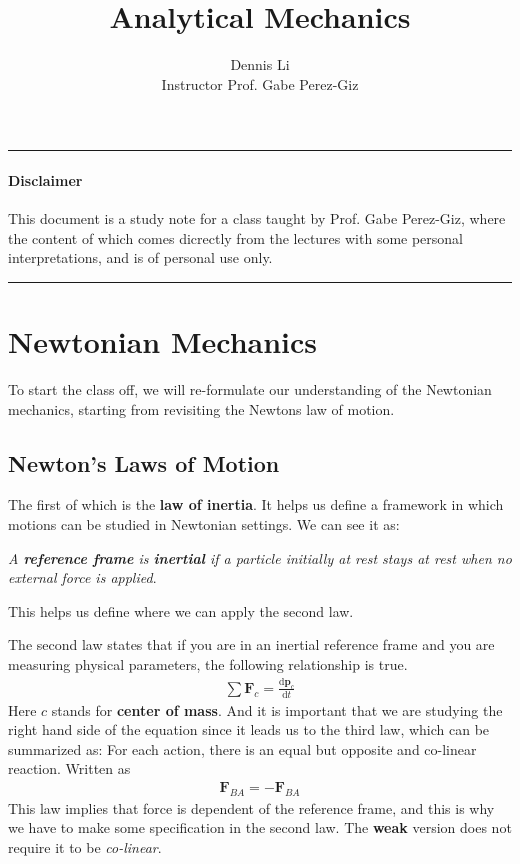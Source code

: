 \documentclass[12pt]{article}
\title{\textbf{Analytical Mechanics}}
\author{Dennis Li\\Instructor Prof. Gabe Perez-Giz}
\newcommand{\dydx}[2]{\frac{\text{d} #1}{\text{d} #2}}
\begin{document}
\maketitle
\hrule
\paragraph{Disclaimer} This document is a study note for a class taught by Prof. Gabe Perez-Giz, where the content of which comes dicrectly from the lectures with some personal interpretations, and is of personal use only.
\vspace{3ex}
\hrule

\section{Newtonian Mechanics}
To start the class off, we will re-formulate our understanding of the Newtonian mechanics, starting from revisiting the Newtons law of motion. 

\subsection{Newton's Laws of Motion}
The first of which is the \textbf{law of inertia}. It helps us define a framework in which motions can be studied in Newtonian settings. We can see it as: 

\textit{A \textbf{reference frame} is \textbf{inertial} if a particle initially at rest stays at rest when no external force is applied}. 


This helps us define where we can apply the second law.

The second law states that if you are in an inertial reference frame and you are measuring physical parameters, the following relationship is true.
\begin{align}
\sum \mathbf{F}_{c} = \dydx{\mathbf{p}_{c}}{t}
\end{align}
Here $c$ stands for \textbf{center of mass}. And it is important that we are studying the right hand side of the equation since it leads us to the third law, which can be summarized as: For each action, there is an equal but opposite and co-linear reaction. Written as
\begin{align}
\mathbf{F}_{BA} = - \mathbf{F}_{BA}
\end{align}
This law implies that force is dependent of the reference frame, and this is why we have to make some specification in the second law. The \textbf{weak} version does not require it to be \textit{co-linear}.
\end{document}
